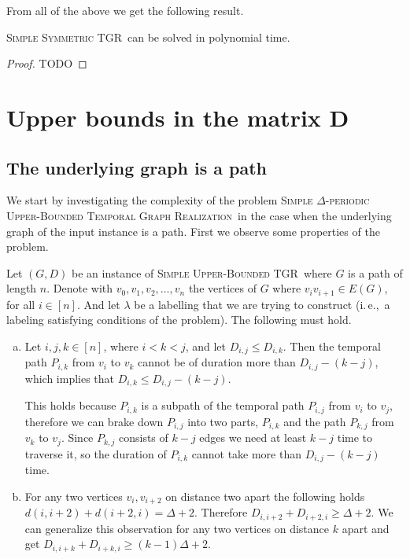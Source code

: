 \documentclass[a4paper,UKenglish,cleveref, autoref, thm-restate]{lipics-v2021}
\newcommand{\ie}{i.\,e.,\ }
\newcommand{\deltaSymExact}{\textsc{Simple Symmetric TGR}}
\newcommand{\DeltaUpperBoundLong}{\textsc{Simple $\Delta$-periodic Upper-Bounded Temporal Graph Realization}}
\newcommand{\deltaUpperBound}{\textsc{Simple Upper-Bounded TGR}}
\begin{document}
From all of the above we get the following result.
\begin{theorem}
	\deltaSymExact\ can be solved in polynomial time.
\end{theorem}

\begin{proof}
	TODO
\end{proof}

\section{Upper bounds in the matrix D}

\subsection{The underlying graph is a path}
We start by investigating the complexity of the problem \DeltaUpperBoundLong\ in the case when the underlying graph of the input instance is a path.
First we observe some properties of the problem.

Let $(G,D)$ be an instance of \deltaUpperBound\, where $G$ is a path of length $n$.
Denote with $v_0,v_1, v_2, \dots, v_n$ the vertices of $G$ where $v_{i}v_{i+1} \in E(G)$, for all $i \in [n]$.
And let $\lambda$ be a labelling that we are trying to construct (\ie a labeling satisfying conditions of the problem).
The following must hold.
\begin{enumerate}[(a)]
	\item \label{path:enum-1}
 Let $i,j,k \in [n]$, where $i < k < j$, and let $D_{i,j} \leq D_{i,k}$. 
 Then the temporal path $P_{i,k}$ from $v_i$ to $v_k$ cannot be of duration more than $D_{i,j} - (k-j)$,
 which implies that $D_{i,k} \leq D_{i,j} - (k-j)$.
 
 This holds because $P_{i,k}$ is a subpath of the temporal path $P_{i,j}$ from $v_i$ to $v_j$,
 therefore we can brake down $P_{i,j}$ into two parts, $P_{i,k}$ and the path $P_{k,j}$ from $v_k$ to $v_j$.
 Since $P_{k,j}$ consists of $k-j$ edges we need at least $k-j$ time to traverse it, so the duration of $P_{i,k}$ cannot take more than $D_{i,j} - (k-j)$ time.

    \item \label{path:enum-2}
     For any two vertices $v_i, v_{i+2}$ on distance two apart the following holds $d(i, i+2) + d(i+2, i) = \Delta + 2$.
     Therefore $D_{i,i+2} + D_{i+2,i} \geq \Delta + 2$.
     We can generalize this observation for any two vertices on distance $k$ apart and get 
     $D_{i,i+k} + D_{i+k,i} \geq (k-1) \Delta + 2$.

\end{enumerate}
\end{document}
